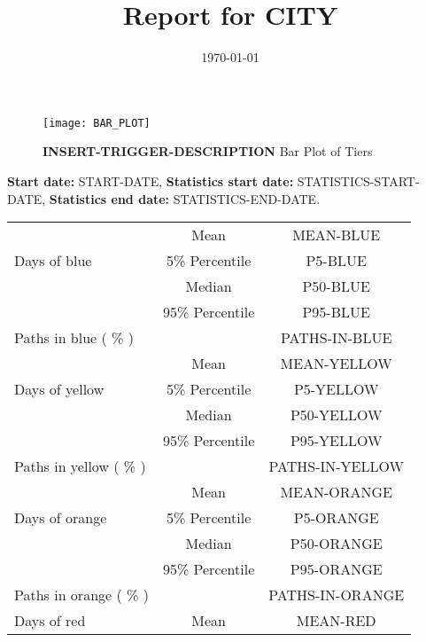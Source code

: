 \documentclass{article}
\title{Report for CITY}
\author{}
\date{\today}
\begin{document}
\begin{figure}[!htb]
  \centering
   \texttt{[image: BAR\_PLOT]}
   \caption{\textbf{INSERT-TRIGGER-DESCRIPTION} Bar Plot of Tiers}
      \label{fig:IHT}
\end{figure}
 \textbf{Start date:} START-DATE,	
\textbf{Statistics start date:} STATISTICS-START-DATE,
\textbf{Statistics end date:} STATISTICS-END-DATE.
\begin{table}[!htb]
	\centering
	\begin{tabular}{p{4cm}cc}
		\toprule
		\multirow{3}{*}{Days of blue} & Mean      & MEAN-BLUE                     \\ \cmidrule(l){2-3} 
		& 5\% Percentile    & P5-BLUE                      \\ \cmidrule(l){2-3} 
		& Median    & P50-BLUE                     \\ \cmidrule(l){2-3} 
		& 95\% Percentile    & P95-BLUE                          \\ \midrule 
		\multirow{1}{*}{Paths in blue ( \% )} &      &         PATHS-IN-BLUE                \\   \midrule
		\multirow{3}{*}{Days of yellow} & Mean      & MEAN-YELLOW                       \\ \cmidrule(l){2-3} 
		& 5\% Percentile    & P5-YELLOW                      \\ \cmidrule(l){2-3} 
		& Median    & P50-YELLOW                     \\ \cmidrule(l){2-3} 
		& 95\% Percentile    & P95-YELLOW                     \\ \midrule    
		\multirow{1}{*}{Paths in yellow ( \% )} &      &         PATHS-IN-YELLOW           \\   \midrule
		\multirow{3}{*}{Days of orange} & Mean      & MEAN-ORANGE                    \\ \cmidrule(l){2-3} 
		& 5\% Percentile    & P5-ORANGE                      \\ \cmidrule(l){2-3} 
		& Median    & P50-ORANGE                    \\ \cmidrule(l){2-3} 
		& 95\% Percentile    & P95-ORANGE                      \\ \midrule    
		\multirow{1}{*}{Paths in orange ( \% )} &      &         PATHS-IN-ORANGE              \\   \midrule
		\multirow{3}{*}{Days of red} & Mean      & MEAN-RED                        \\ \cmidrule(l){2-3} 

\end{tabular}
\end{table}
\end{document}
